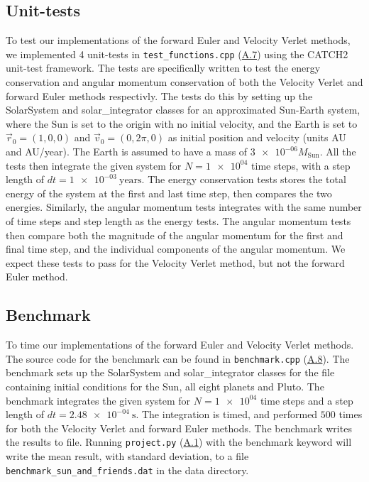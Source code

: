 \documentclass[reprint,english,notitlepage]{revtex4-1}  %
\begin{document}
\subsection{Unit-tests} \label{sec:III:d}
To test our implementations of the forward Euler and Velocity Verlet methods, we implemented 4 unit-tests in \verb+test_functions.cpp+ (\hyperref[A.7]{A.7}) using the CATCH2 unit-test framework. The tests are specifically written to test the energy conservation and angular momentum conservation of both the Velocity Verlet and forward Euler methods respectivly. The tests do this by setting up the SolarSystem and solar\_integrator classes for an approximated Sun-Earth system, where the Sun is set to the origin with no initial velocity, and the Earth is set to \(\vec{r}_{0} = (1, 0, 0)\) and \(\vec{v}_{0} = (0, 2\pi, 0)\) as initial position and velocity (units AU and AU/year). The Earth is assumed to have a mass of \(\num{3e-06}M_\text{Sun}\). All the tests then integrate the given system for \(N=\num{1e+04}\) time steps, with a step length of \(dt = \SI{1e-03}{\text{years}}\). The energy conservation tests stores the total energy of the system at the first and last time step, then compares the two energies. Similarly, the angular momentum tests integrates with the same number of time steps and step length as the energy tests. The angular momentum tests then compare both the magnitude of the angular momentum for the first and final time step, and the individual components of the angular momentum. We expect these tests to pass for the Velocity Verlet method, but not the forward Euler method.

\subsection{Benchmark} \label{sec:III:e}
To time our implementations of the forward Euler and Velocity Verlet methods. The source code for the benchmark can be found in \verb+benchmark.cpp+ (\hyperref[A.8]{A.8}). The benchmark sets up the SolarSystem and solar\_integrator classes for the file containing initial conditions for the Sun, all eight planets and Pluto. The benchmark integrates the given system for \(N = \num{1e+04}\) time steps and a step length of \(dt = \SI{2.48e-04}{\second}\). The integration is timed, and performed \(500\) times for both the Velocity Verlet and forward Euler methods. The benchmark writes the results to file. Running \verb+project.py+ (\hyperref[A.1]{A.1}) with the benchmark keyword will write the mean result, with standard deviation, to a file \verb+benchmark_sun_and_friends.dat+ in the data directory.
\end{document}
